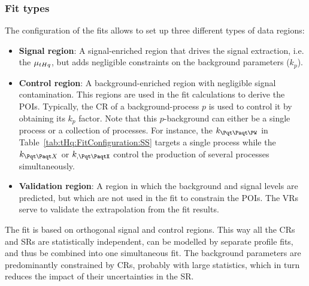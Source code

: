 \subsubsection{Fit types}
\label{sec:ChaptH:Fit:strategy:fitypes}
The configuration of the fits allows to set up three different types of data regions:
\begin{itemize}
	\item \textbf{Signal region}:  A signal-enriched region that drives the signal extraction, i.e. the $\mu_{tHq}$,
						 but adds negligible constraints on the background parameters ($k_{p}$).
	\item \textbf{Control region}: A background-enriched region with negligible signal contamination. 
						This regions are used in the fit calculations to derive the POIs. Typically,
						the CR of a background-process $p$ is used to control it by obtaining its
						$k_{p}$ factor. Note that this $p$-background can either be a single process
						or a collection of processes.  For instance, the $k_{\ttW}$ in Table~\ref{tab:tHq:FitConfiguration:SS}
						targets a single process while the $k_{\ttX}$ or $k_{\tt, \ttX}$ control the production of
						several processes simultaneously. 
						
	\item \textbf{Validation region}: A region in which the background and signal levels are predicted, 
						but which are not used in the fit to constrain the POIs. 
						The VRs serve to validate the extrapolation from the fit results.
\end{itemize}


The fit is based on orthogonal signal and control regions. This way all the CRs and SRs are statistically 
independent, can be modelled by separate profile fits, and thus be combined into one simultaneous fit.
The background parameters are predominantly constrained by CRs, probably with large statistics, which 
in turn reduces the impact of their uncertainties in the SR.

